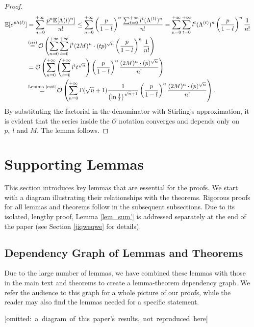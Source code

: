 \documentclass{article} %
\begin{document}
\begin{proof}
\begin{align*}
\mathbb{E}[e^{p\Lambda(l)}] & = \sum_{n=0}^{+\infty} \frac{p^{n}\mathbb{E}[\Lambda(l)^n]}{n!}\le\sum_{n=0}^{+\infty} \left(\frac{p}{1-l}\right)^{n}\frac{\sum_{t=0}^{+\infty}l^{t}(\Lambda^{(t)})^{n}}{n!}  =\sum_{n=0}^{+\infty} \sum_{t=0}^{+\infty}l^{t}(\Lambda^{(t)})^{n}\left(\frac{p}{1-l}\right)^{n}\frac{1}{n!}  \\&\mathop{=}^{(iii)}\mathcal{O}\left(\sum_{n=0}^{+\infty} \sum_{t=0}^{+\infty}l^{t}(2M)^{n}\cdot (tp)^{\sqrt{n}}\left(\frac{p}{1-l}\right)^{n}\frac{1}{n!}\right)\\&=\mathcal{O}\left(\sum_{n=0}^{+\infty} \left(\sum_{t=0}^{+\infty}l^{t}t^{\sqrt{n}}\right)\left(\frac{p}{1-l}\right)^{n}\frac{(2M)^{n}\cdot (p)^{\sqrt{n}}}{n!}\right)\\&\mathop{=}^{\text{Lemma \ref{esti}}}\mathcal{O}\left(\sum_{n=0}^{+\infty} \Gamma(\sqrt{n}+1)\frac{1}{\left( \ln \frac{1}{l} \right)^{\sqrt{n} + 1}}\left(\frac{p}{1-l}\right)^{n}\frac{(2M)^{n}\cdot (p)^{\sqrt{n}}}{n!}\right).
\end{align*}
By substituting the factorial in the denominator with Stirling's approximation, it is evident that the series inside the $\mathcal{O}$ notation converges and depends only on $p,\ l$ and $M$. The lemma follows.
\end{proof}


\section{Supporting Lemmas}
This section introduces key lemmas that are essential for the proofs.  We start with a diagram illustrating their relationships with the theorems. Rigorous proofs for all lemmas and theorems follow in the subsequent subsections. Due to its isolated, lengthy proof, Lemma \ref{lem_sum'} is addressed separately at the end of the paper (see Section \ref{jiqweqwe} for details).

\subsection{Dependency Graph of Lemmas and Theorems}

Due to the large number of lemmas, we have combined these lemmas with those in the main text and theorems to create a lemma-theorem dependency graph. We refer the audience to this graph for a whole picture of our proofs, while the reader may also find the lemmas needed for a specific statement.

\mbox{[omitted: a diagram of this paper's results, not reproduced here]}
\end{document}
